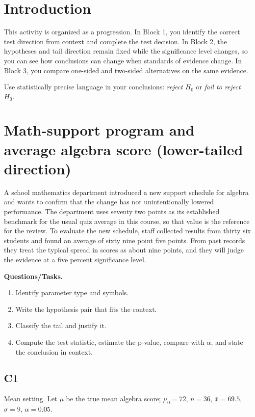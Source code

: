 \section{Introduction}
This activity is organized as a progression. In Block 1, you identify the correct test direction from context and complete the test decision. In Block 2, the hypotheses and tail direction remain fixed while the significance level changes, so you can see how conclusions can change when standards of evidence change. In Block 3, you compare one-sided and two-sided alternatives on the same evidence.

Use statistically precise language in your conclusions: \emph{reject \(H_0\)} or \emph{fail to reject \(H_0\)}.

\section{Math-support program and average algebra score (lower-tailed direction)}
A school mathematics department introduced a new support schedule for algebra and wants to confirm that the change has not unintentionally lowered performance. The department uses seventy two points as its established benchmark for the usual quiz average in this course, so that value is the reference for the review. To evaluate the new schedule, staff collected results from thirty six students and found an average of sixty nine point five points. From past records they treat the typical spread in scores as about nine points, and they will judge the evidence at a five percent significance level.

\textbf{Questions/Tasks.}
\begin{enumerate}
    \item[(C1)] Identify parameter type and symbols.
    \item[(C2)] Write the hypothesis pair that fits the context.
    \item[(C3)] Classify the tail and justify it.
    \item[(Extra analysis)] Compute the test statistic, estimate the p-value, compare with \(\alpha\), and state the conclusion in context.
\end{enumerate}

\subsection*{C1}
Mean setting. Let \(\mu\) be the true mean algebra score; \(\mu_0=72\), \(n=36\), \(\bar{x}=69.5\), \(\sigma=9\), \(\alpha=0.05\).

